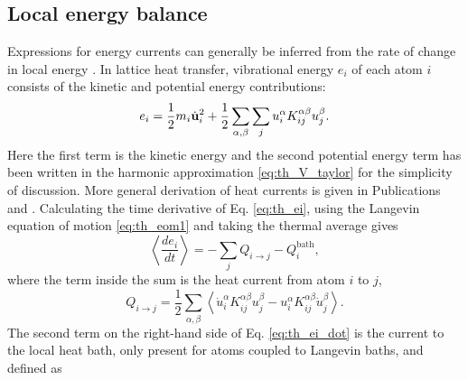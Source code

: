 

\subsection{Local energy balance}
\label{sec:th_energybalance}
Expressions for energy currents can generally be inferred from the rate of change in local energy \cite{hardy63}. In lattice heat transfer, vibrational energy $e_i$ of each atom $i$ consists of the kinetic and potential energy contributions:
\begin{equation}
 e_i = \frac{1}{2}m_i\dot{\mathbf{u}}_i^2 + \frac{1}{2} \sum_{\alpha,\beta}\sum_j u_i^{\alpha} K_{ij}^{\alpha\beta} u_j^{\beta} . \label{eq:th_ei}
\end{equation}
Here the first term is the kinetic energy and the second potential energy term has been written in the harmonic approximation \eqref{eq:th_V_taylor} for the simplicity of discussion. More general derivation of heat currents is given in Publications  and . Calculating the time derivative of Eq. \eqref{eq:th_ei}, using the Langevin equation of motion \eqref{eq:th_eom1} and taking the thermal average gives
\begin{equation}
 \left\langle \frac{de_i}{dt} \right\rangle = -\sum_j  Q_{i\to j} -  Q_i^{\textrm{bath}} , \label{eq:th_ei_dot}
\end{equation}
where the term inside the sum is the heat current from atom $i$ to $j$,
\begin{equation}
 Q_{i \to j} = \frac{1}{2} \sum_{\alpha,\beta} \left\langle \dot{u}_i^{\alpha}K_{ij}^{\alpha\beta} u_j^{\beta} - u_i^{\alpha} K_{ij}^{\alpha\beta} \dot{u}_j^{\beta} \right\rangle. \label{eq:th_Qij}
\end{equation}
The second term on the right-hand side of Eq. \eqref{eq:th_ei_dot} is the current to the local heat bath, only present for atoms coupled to Langevin baths, and defined as 
